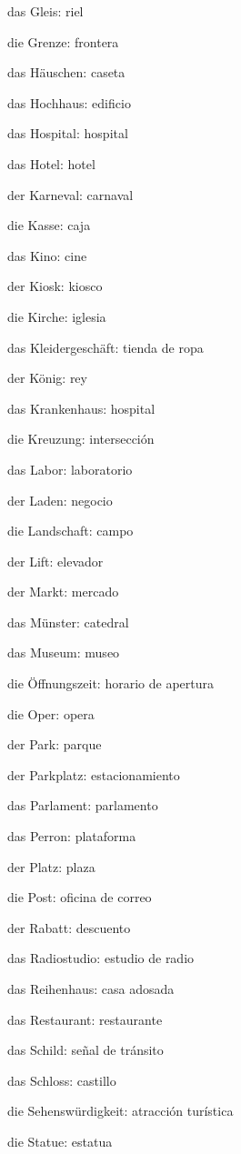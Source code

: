\begin{multicols}{2}
\begin{myitemize}
\item das Gleis: riel
\item die Grenze: frontera
\item das Häuschen: caseta
\item das Hochhaus: edificio
\item das Hospital: hospital
\item das Hotel: hotel
\item der Karneval: carnaval
\item die Kasse: caja
\item das Kino: cine
\item der Kiosk: kiosco
\item die Kirche: iglesia
\item das Kleidergeschäft: tienda de ropa
\item der König: rey
\item das Krankenhaus: hospital
\item die Kreuzung: intersección
\item das Labor: laboratorio
\item der Laden: negocio
\item die Landschaft: campo
\item der Lift: elevador
\item der Markt: mercado
\item das Münster: catedral
\item das Museum: museo
\item die Öffnungszeit: horario de apertura
\item die Oper: opera
\item der Park: parque
\item der Parkplatz: estacionamiento
\item das Parlament: parlamento
\item das Perron: plataforma
\item der Platz: plaza
\item die Post: oficina de correo
\item der Rabatt: descuento
\item das Radiostudio: estudio de radio
\item das Reihenhaus: casa adosada
\item das Restaurant: restaurante
\item das Schild: señal de tránsito
\item das Schloss: castillo
\item die Sehenswürdigkeit: atracción turística
\item die Statue: estatua

\end{myitemize}
\end{multicols}
